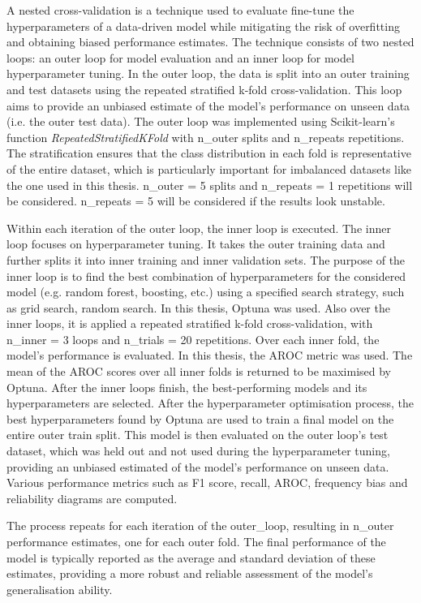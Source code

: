 A nested cross-validation is a technique used to evaluate fine-tune the hyperparameters of a data-driven model while mitigating the risk of overfitting and obtaining biased performance estimates. The technique consists of two nested loops: an outer loop for model evaluation and an inner loop for model hyperparameter tuning. In the outer loop, the data is split into an outer training and test datasets using the repeated stratified k-fold cross-validation. This loop aims to provide an unbiased estimate of the model's performance on unseen data (i.e. the outer test data). The outer loop was implemented using Scikit-learn's function \textit{RepeatedStratifiedKFold} with n\_outer splits and n\_repeats repetitions. The stratification ensures that the class distribution in each fold is representative of the entire dataset, which is particularly important for imbalanced datasets like the one used in this thesis. n\_outer = 5 splits and n\_repeats = 1 repetitions will be considered. n\_repeats = 5 will be considered if the results look unstable. 

Within each iteration of the outer loop, the inner loop is executed. The inner loop focuses on hyperparameter tuning. It takes the outer training data and further splits it into inner training and inner validation sets. The purpose of the inner loop is to find the best combination of hyperparameters for the considered model (e.g. random forest, boosting, etc.) using a specified search strategy, such as grid search, random search. In this thesis, Optuna was used. Also over the inner loops, it is applied a repeated stratified k-fold cross-validation, with n\_inner = 3 loops and n\_trials = 20 repetitions. Over each inner fold, the model's performance is evaluated. In this thesis, the AROC metric was used. The mean of the AROC scores over all inner folds is returned to be maximised by Optuna. After the inner loops finish, the best-performing models and its hyperparameters are selected. After the hyperparameter optimisation process, the best hyperparameters found by Optuna are used to train a final model on the entire outer train split. This model is then evaluated on the outer loop's test dataset, which was held out and not used during the hyperparameter tuning, providing an unbiased estimated of the model's performance on unseen data. Various performance metrics such as F1 score, recall, AROC, frequency bias and reliability diagrams are computed. 

The process repeats for each iteration of the outer\_loop, resulting in n\_outer performance estimates, one for each outer fold. The final performance of the model is typically reported as the average and standard deviation of these estimates, providing a more robust and reliable assessment of the model's generalisation ability.

